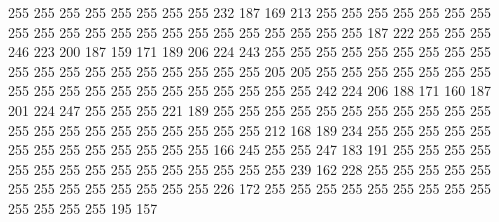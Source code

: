255 255 255 255 255 255 255 255 232 187 169 213 255 255 255 255 255 255 255 255
255 255 255 255 255 255 255 255 255 255 255 255 255 187 222 255 255 255 246 223
200 187 159 171 189 206 224 243 255 255 255 255 255 255 255 255 255 255 255 255
255 255 255 255 255 255 255 205 205 255 255 255 255 255 255 255 255 255 255 255
255 255 255 255 255 255 255 255 242 224 206 188 171 160 187 201 224 247 255 255
255 221 189 255 255 255 255 255 255 255 255 255 255 255 255 255 255 255 255 255
255 255 255 255 212 168 189 234 255 255 255 255 255 255 255 255 255 255 255 255
255 166 245 255 255 247 183 191 255 255 255 255 255 255 255 255 255 255 255 255
255 255 255 239 162 228 255 255 255 255 255 255 255 255 255 255 255 255 255 226
172 255 255 255 255 255 255 255 255 255 255 255 255 255 195 157
